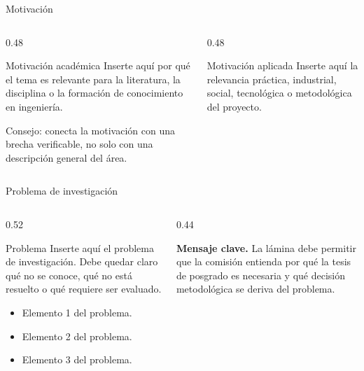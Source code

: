 \begin{frame}{Motivación}
  \begin{columns}[T,onlytextwidth]
    \begin{column}{0.48\textwidth}
      \begin{UCBlock}{Motivación académica}
        Inserte aquí por qué el tema es relevante para la literatura, la disciplina o la formación de conocimiento en ingeniería.
      \end{UCBlock}
      \begin{UCNeutralBox}
        Consejo: conecta la motivación con una brecha verificable, no solo con una descripción general del área.
      \end{UCNeutralBox}
    \end{column}
    \begin{column}{0.48\textwidth}
      \begin{UCBlock}{Motivación aplicada}
        Inserte aquí la relevancia práctica, industrial, social, tecnológica o metodológica del proyecto.
      \end{UCBlock}
    \end{column}
  \end{columns}
\end{frame}

\begin{frame}{Problema de investigación}
  \begin{columns}[T,onlytextwidth]
    \begin{column}{0.52\textwidth}
      \begin{UCBlock}{Problema}
        Inserte aquí el problema de investigación. Debe quedar claro qué no se conoce, qué no está resuelto o qué requiere ser evaluado.
      \end{UCBlock}
      \begin{itemize}
        \item Elemento 1 del problema.
        \item Elemento 2 del problema.
        \item Elemento 3 del problema.
      \end{itemize}
    \end{column}
    \begin{column}{0.44\textwidth}
      \begin{UCKeyPoint}
        \textbf{Mensaje clave.} La lámina debe permitir que la comisión entienda por qué la tesis de posgrado es necesaria y qué decisión metodológica se deriva del problema.
      \end{UCKeyPoint}
    \end{column}
  \end{columns}
\end{frame}

